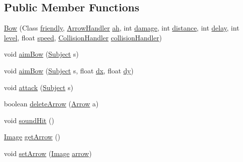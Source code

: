 \subsection*{Public Member Functions}
\begin{DoxyCompactItemize}
\item 
\mbox{\hyperlink{classitems_1_1weapons_1_1_bow_a9534e58ec2be5748c6dce306686b81ca}{Bow}} (Class \mbox{\hyperlink{classitems_1_1weapons_1_1_bow_aa10796e9bea482d14d3788719c606647}{friendly}}, \mbox{\hyperlink{classitems_1_1weapons_1_1_arrow_handler}{Arrow\+Handler}} \mbox{\hyperlink{classitems_1_1weapons_1_1_bow_a04ecddeefa27f007f2e29a8fc8298e23}{ah}}, int \mbox{\hyperlink{classitems_1_1weapons_1_1_weapon_aa84d0aca66daedb3adb9209b6f2846a3}{damage}}, int \mbox{\hyperlink{classitems_1_1weapons_1_1_weapon_a125dc77704bbb1758d35f282802dcb8d}{distance}}, int \mbox{\hyperlink{classitems_1_1weapons_1_1_weapon_acf51fcf734c1ce98cbc6d1c2912e8058}{delay}}, int \mbox{\hyperlink{classitems_1_1weapons_1_1_weapon_ae66ceb47ad12380ee5d39960606980b3}{level}}, float \mbox{\hyperlink{classitems_1_1weapons_1_1_weapon_ac653ddf600cd6add7078dc32b5f1584a}{speed}}, \mbox{\hyperlink{classentities_1_1_collision_handler}{Collision\+Handler}} \mbox{\hyperlink{classitems_1_1weapons_1_1_bow_a58b10332a113699f11dabaf41f76560a}{collision\+Handler}})
\item 
void \mbox{\hyperlink{classitems_1_1weapons_1_1_bow_a50714784825adf923fa0f7bc44612cfa}{aim\+Bow}} (\mbox{\hyperlink{classentities_1_1_subject}{Subject}} s)
\item 
void \mbox{\hyperlink{classitems_1_1weapons_1_1_bow_af54ddd6eaf7209320e6ab870ce513ddc}{aim\+Bow}} (\mbox{\hyperlink{classentities_1_1_subject}{Subject}} s, float \mbox{\hyperlink{classitems_1_1weapons_1_1_bow_a5f5ced169bab348188e9b06ac6862a2b}{dx}}, float \mbox{\hyperlink{classitems_1_1weapons_1_1_bow_a64b7302a20f953d5940e5063d523d772}{dy}})
\item 
void \mbox{\hyperlink{classitems_1_1weapons_1_1_bow_a426f622db5ad46a8f49487a95b57c94f}{attack}} (\mbox{\hyperlink{classentities_1_1_subject}{Subject}} s)
\item 
boolean \mbox{\hyperlink{classitems_1_1weapons_1_1_bow_a5786de599b80d151eb240b7801165ea5}{delete\+Arrow}} (\mbox{\hyperlink{classitems_1_1weapons_1_1_arrow}{Arrow}} a)
\item 
void \mbox{\hyperlink{classitems_1_1weapons_1_1_bow_a05eec2be368f97db02fa22296632b954}{sound\+Hit}} ()
\item 
\mbox{\hyperlink{classorg_1_1newdawn_1_1slick_1_1_image}{Image}} \mbox{\hyperlink{classitems_1_1weapons_1_1_bow_a969771698d6f7ab777a725c131ee362a}{get\+Arrow}} ()
\item 
void \mbox{\hyperlink{classitems_1_1weapons_1_1_bow_a80b33c84308d1578fbc6b436a86a6694}{set\+Arrow}} (\mbox{\hyperlink{classorg_1_1newdawn_1_1slick_1_1_image}{Image}} \mbox{\hyperlink{classitems_1_1weapons_1_1_bow_a6bb996a10bf375e8a93d452fb7ee70a9}{arrow}})
\end{DoxyCompactItemize}

